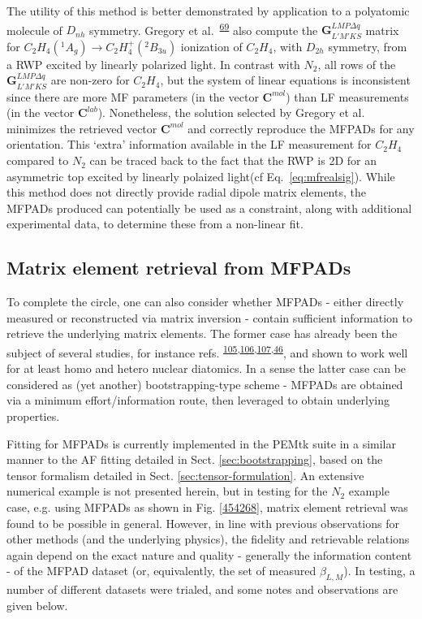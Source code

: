 \documentclass[10pt]{article}
\begin{document}
The utility of this method is better demonstrated by application to a polyatomic molecule of $D_{nh}$ symmetry. Gregory et al.~\textsuperscript{\hyperref[csl:69]{69}} also compute the $\mathbf{{G}}^{LMP\Delta q }_{L'M'KS}$ matrix for $C_2H_4(^1A_g) \rightarrow C_2H_4^+(^2B_{3u})$ ionization of $C_2H_4$, with $D_{2h}$ symmetry, from a RWP excited by linearly polarized light. In contrast with $N_2$, all rows of the $\mathbf{{G}}^{LMP\Delta q }_{L'M'KS}$ are non-zero for $C_2H_4$, but the system of linear equations is inconsistent since there are more MF parameters (in the vector $\mathbf{C}^{mol}$) than LF measurements (in the vector $\mathbf{C}^{lab}$). Nonetheless, the solution selected by Gregory et al. minimizes the retrieved vector $\mathbf{C}^{mol}$ and correctly reproduce the MFPADs for any orientation. This `extra' information available in the LF measurement for $C_2H_4$ compared to $N_2$ can be traced back to the fact that the RWP is 2D for an asymmetric top excited by linearly polaized light(cf Eq.~\ref{eq:mfrealsig}). While this method does not directly provide radial dipole matrix elements, the MFPADs produced can potentially be used as a constraint, along with additional experimental data, to determine these from a non-linear fit. 

\subsection{Matrix element retrieval from MFPADs\label{sec:recon-from-MFPADs}}

To complete the circle, one can also consider whether MFPADs - either directly measured or reconstructed via matrix inversion - contain sufficient information to retrieve the underlying matrix elements.  The former case has already been the subject of several studies, for instance refs. \textsuperscript{\hyperref[csl:105]{105},\hyperref[csl:106]{106},\hyperref[csl:107]{107},\hyperref[csl:46]{46}}, and shown to work well for at least homo and hetero nuclear diatomics. In a sense the latter case can be considered as (yet another) bootstrapping-type scheme - MFPADs are obtained via a minimum effort/information route, then leveraged to obtain underlying properties. 

Fitting for MFPADs is currently implemented in the PEMtk suite in a similar manner to the AF fitting detailed in Sect. \ref{sec:bootstrapping}, based on the tensor formalism detailed in Sect. \ref{sec:tensor-formulation}. An extensive numerical example is not presented herein, but in testing for the $N_{2}$ example case, e.g. using MFPADs as shown in Fig. \ref{454268}, matrix element retrieval was found to be possible in general. However, in line with previous observations for other methods (and the underlying physics), the fidelity and retrievable relations again depend on the exact nature and quality - generally the information content - of the MFPAD dataset (or, equivalently, the set of measured $\beta_{L,M}$). In testing, a number of different datasets were trialed, and some notes and observations are given below.
\end{document}
